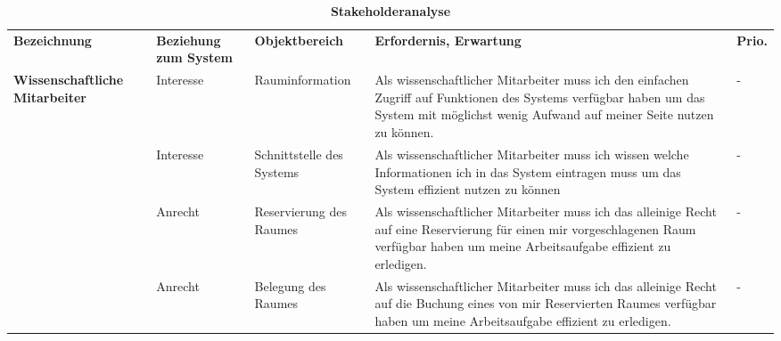 \begin{table}
	
 	\caption{\textbf{Stakeholderanalyse}}
 	\begin{tabularx}{\textwidth}{|X|X|X|X|m{}|}			
 		\rowcolor{heading}\textbf{Bezeichnung} & \textbf{Beziehung zum System} & \textbf{Objektbereich} & \textbf{Erfordernis, Erwartung} & \textbf{Prio.}\\
			 
 	\textbf{Wissenschaftliche Mitarbeiter} & Interesse & Rauminformation & Als wissenschaftlicher Mitarbeiter muss ich den einfachen Zugriff auf Funktionen des Systems verfügbar haben um das System mit möglichst wenig Aufwand auf meiner Seite nutzen zu können. & -\\
\rowcolor{odd}		 & Interesse & Schnittstelle des Systems & Als wissenschaftlicher Mitarbeiter muss ich wissen welche Informationen ich in das System eintragen muss um das System effizient nutzen zu können & -\\
	& Anrecht & Reservierung des Raumes & Als wissenschaftlicher Mitarbeiter muss ich das alleinige Recht auf eine Reservierung für einen mir vorgeschlagenen Raum verfügbar haben um meine Arbeitsaufgabe effizient zu erledigen. & -\\
\rowcolor{odd} & Anrecht & Belegung des Raumes & Als wissenschaftlicher Mitarbeiter muss ich das alleinige Recht auf die Buchung eines von mir Reservierten Raumes verfügbar haben um meine Arbeitsaufgabe effizient zu erledigen. & -\\ \hline
 	\end{tabularx}
 	
\end{table}

